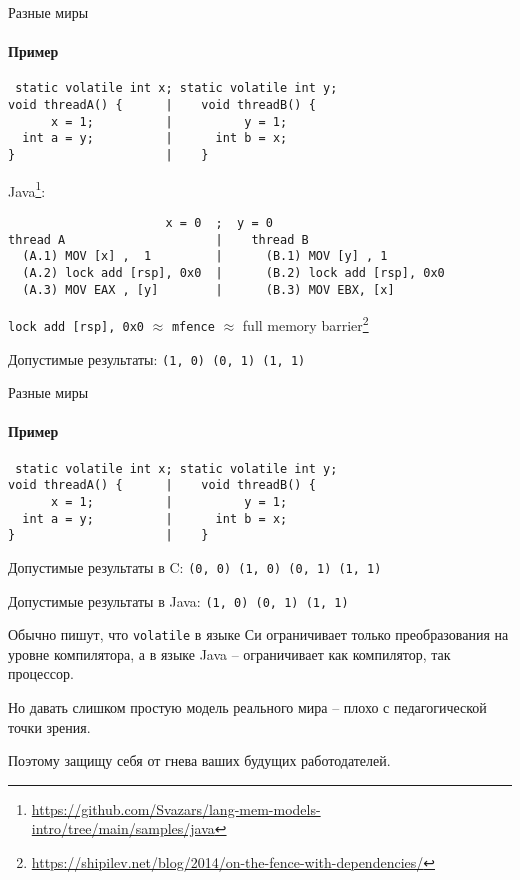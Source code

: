 \begin{frame}{Разные миры}
\framesubtitle{Пример}

\begin{lstlisting}
 static volatile int x; static volatile int y;            
void threadA() {      |    void threadB() {                                   
      x = 1;          |          y = 1;                           
  int a = y;          |      int b = x;                           
}                     |    }                    
\end{lstlisting}


Java\footnote{\tiny\url{https://github.com/Svazars/lang-mem-models-intro/tree/main/samples/java}}:

\begin{lstlisting}
                      x = 0  ;  y = 0
thread A                     |    thread B          
  (A.1) MOV [x] ,  1         |      (B.1) MOV [y] , 1  
  (A.2) lock add [rsp], 0x0  |      (B.2) lock add [rsp], 0x0
  (A.3) MOV EAX , [y]        |      (B.3) MOV EBX, [x] 
\end{lstlisting}

\pause
\texttt{lock add [rsp], 0x0} $\approx$ \texttt{mfence} $\approx$ full memory barrier\footnote<2->{\tiny\url{https://shipilev.net/blog/2014/on-the-fence-with-dependencies/}}

\pause
Допустимые результаты: \texttt{(1, 0) (0, 1) (1, 1)}

\end{frame}


\begin{frame}{Разные миры}
\framesubtitle{Пример}

\begin{lstlisting}
 static volatile int x; static volatile int y;            
void threadA() {      |    void threadB() {                                   
      x = 1;          |          y = 1;                           
  int a = y;          |      int b = x;                           
}                     |    }                    
\end{lstlisting}

Допустимые результаты в C: \texttt{(0, 0) (1, 0) (0, 1) (1, 1)}

Допустимые результаты в Java: \texttt{(1, 0) (0, 1) (1, 1)}

\pause
Обычно пишут, что \texttt{volatile} в языке Си ограничивает только преобразования на уровне компилятора, а в языке Java -- ограничивает как компилятор, так процессор.

\pause
Но давать слишком простую модель реального мира -- плохо с педагогической точки зрения.

\pause
Поэтому защищу себя от гнева ваших будущих работодателей.

\end{frame}


